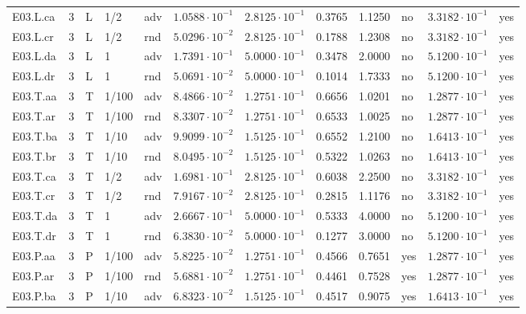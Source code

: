 {\begin{longtable}{@{}lllllllllll l@{}}
E03.L.ca & 3 & L & 1/2 & adv & $1.0588\cdot 10^{-1}$ & $2.8125\cdot 10^{-1}$ & 0.3765 & 1.1250 & no & $3.3182\cdot 10^{-1}$ & yes \\
E03.L.cr & 3 & L & 1/2 & rnd & $5.0296\cdot 10^{-2}$ & $2.8125\cdot 10^{-1}$ & 0.1788 & 1.2308 & no & $3.3182\cdot 10^{-1}$ & yes \\
E03.L.da & 3 & L & 1 & adv & $1.7391\cdot 10^{-1}$ & $5.0000\cdot 10^{-1}$ & 0.3478 & 2.0000 & no & $5.1200\cdot 10^{-1}$ & yes \\
E03.L.dr & 3 & L & 1 & rnd & $5.0691\cdot 10^{-2}$ & $5.0000\cdot 10^{-1}$ & 0.1014 & 1.7333 & no & $5.1200\cdot 10^{-1}$ & yes \\
E03.T.aa & 3 & T & 1/100 & adv & $8.4866\cdot 10^{-2}$ & $1.2751\cdot 10^{-1}$ & 0.6656 & 1.0201 & no & $1.2877\cdot 10^{-1}$ & yes \\
E03.T.ar & 3 & T & 1/100 & rnd & $8.3307\cdot 10^{-2}$ & $1.2751\cdot 10^{-1}$ & 0.6533 & 1.0025 & no & $1.2877\cdot 10^{-1}$ & yes \\
E03.T.ba & 3 & T & 1/10 & adv & $9.9099\cdot 10^{-2}$ & $1.5125\cdot 10^{-1}$ & 0.6552 & 1.2100 & no & $1.6413\cdot 10^{-1}$ & yes \\
E03.T.br & 3 & T & 1/10 & rnd & $8.0495\cdot 10^{-2}$ & $1.5125\cdot 10^{-1}$ & 0.5322 & 1.0263 & no & $1.6413\cdot 10^{-1}$ & yes \\
E03.T.ca & 3 & T & 1/2 & adv & $1.6981\cdot 10^{-1}$ & $2.8125\cdot 10^{-1}$ & 0.6038 & 2.2500 & no & $3.3182\cdot 10^{-1}$ & yes \\
E03.T.cr & 3 & T & 1/2 & rnd & $7.9167\cdot 10^{-2}$ & $2.8125\cdot 10^{-1}$ & 0.2815 & 1.1176 & no & $3.3182\cdot 10^{-1}$ & yes \\
E03.T.da & 3 & T & 1 & adv & $2.6667\cdot 10^{-1}$ & $5.0000\cdot 10^{-1}$ & 0.5333 & 4.0000 & no & $5.1200\cdot 10^{-1}$ & yes \\
E03.T.dr & 3 & T & 1 & rnd & $6.3830\cdot 10^{-2}$ & $5.0000\cdot 10^{-1}$ & 0.1277 & 3.0000 & no & $5.1200\cdot 10^{-1}$ & yes \\
E03.P.aa & 3 & P & 1/100 & adv & $5.8225\cdot 10^{-2}$ & $1.2751\cdot 10^{-1}$ & 0.4566 & 0.7651 & yes & $1.2877\cdot 10^{-1}$ & yes \\
E03.P.ar & 3 & P & 1/100 & rnd & $5.6881\cdot 10^{-2}$ & $1.2751\cdot 10^{-1}$ & 0.4461 & 0.7528 & yes & $1.2877\cdot 10^{-1}$ & yes \\
E03.P.ba & 3 & P & 1/10 & adv & $6.8323\cdot 10^{-2}$ & $1.5125\cdot 10^{-1}$ & 0.4517 & 0.9075 & yes & $1.6413\cdot 10^{-1}$ & yes \\

\end{longtable}}
